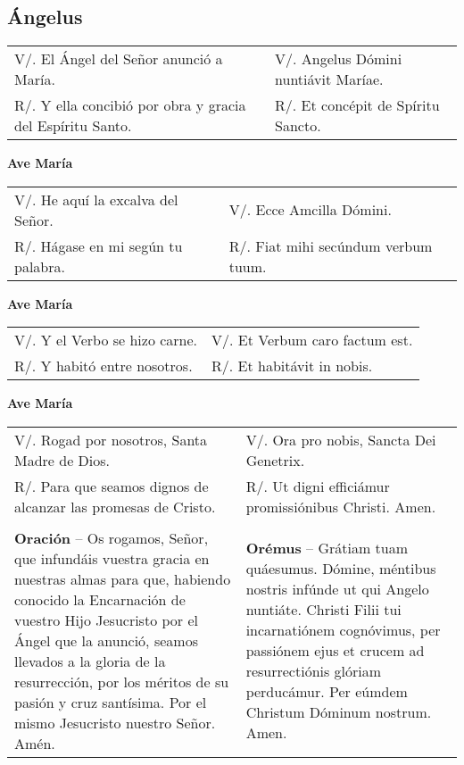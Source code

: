 \documentclass[../devocionario.tex]{subfiles}
\begin{document}
    \subsection*{Ángelus}

    \begin{tabular} { p{} p{} }
        V/. El Ángel del Señor anunció a María. & V/. Angelus Dómini nuntiávit Maríae.\\
        R/. Y ella concibió por obra y gracia del Espíritu Santo. & R/. Et concépit de Spíritu Sancto.
    \end{tabular}

    \begin{center}
        \textbf{Ave María}
    \end{center}

    \begin{tabular} { p{} p{} }
        V/. He aquí la excalva del Señor. & V/. Ecce Amcilla Dómini.\\
        R/. Hágase en mi según tu palabra. & R/. Fiat mihi secúndum verbum tuum.
    \end{tabular}

    \begin{center}
        \textbf{Ave María}
    \end{center}

    \begin{tabular} { p{} p{} }
        V/. Y el Verbo se hizo carne. & V/. Et Verbum caro factum est.\\
        R/. Y habitó entre nosotros. & R/. Et habitávit in nobis.
    \end{tabular}

    \begin{center}
        \textbf{Ave María}
    \end{center}

    \begin{tabular} { p{} p{} }
        V/. Rogad por nosotros, Santa Madre de Dios. & V/. Ora pro nobis, Sancta Dei Genetrix.\\
        R/. Para que seamos dignos de alcanzar las promesas de Cristo. & R/. Ut digni efficiámur promissiónibus Christi. Amen.\\\\
        \textbf{Oración} -- Os rogamos, Señor, que infundáis vuestra gracia en nuestras almas para que, 
        habiendo conocido la Encarnación de vuestro Hijo Jesucristo por el Ángel que la anunció, 
        seamos llevados a la gloria de la resurrección, por los méritos de su pasión y cruz santísima. 
        Por el mismo Jesucristo nuestro Señor. Amén. & 
        \textbf{Orémus} -- Grátiam tuam quáesumus. Dómine, méntibus nostris infúnde ut qui Angelo nuntiáte. 
        Christi Filii tui incarnatiónem cognóvimus, per passiónem ejus et crucem ad resurrectiónis glóriam perducámur. 
        Per eúmdem Christum Dóminum nostrum. Amen.
    \end{tabular}
\end{document}
